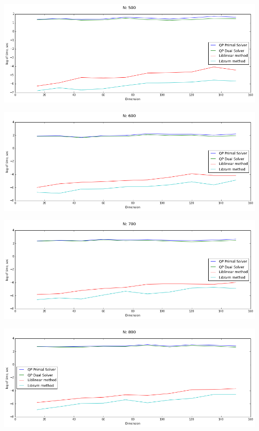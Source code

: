 \documentclass[12pt, a4paper]{article}
\begin{document}
			\begin{center}
				\includegraphics[width=17cm]{1par_N500_one.png}
			\end{center}

			\begin{center}
				\includegraphics[width=17cm]{1par_N600_one.png}
			\end{center}

			\begin{center}
				\includegraphics[width=17cm]{1par_N700_one.png}
			\end{center}

			\begin{center}
				\includegraphics[width=17cm]{1par_N800_one.png}
			\end{center}
\end{document}

